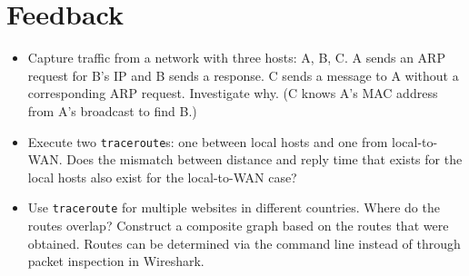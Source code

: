 \section{Feedback}\label{sec:feedback}
\begin{itemize}
	\item Capture traffic from a network with three hosts: A, B, C. A sends an ARP request for B's IP and B sends a response. C sends a message to A without a corresponding ARP request. Investigate why. (C knows A's MAC address from A's broadcast to find B.)
	\item Execute two \texttt{traceroute}s: one between local hosts and one from local-to-WAN. Does the mismatch between distance and reply time that exists for the local hosts also exist for the local-to-WAN case?
	\item Use \texttt{traceroute} for multiple websites in different countries. Where do the routes overlap? Construct a composite graph based on the routes that were obtained. Routes can be determined via the command line instead of through packet inspection in Wireshark.
\end{itemize}
